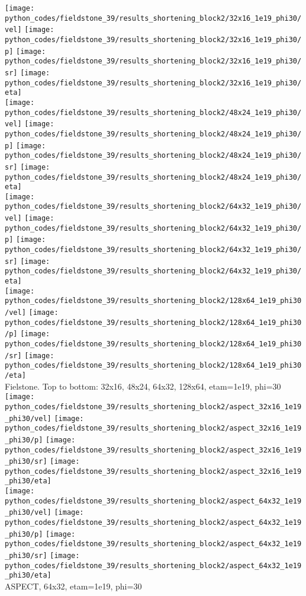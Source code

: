 \begin{center}
\texttt{[image: python\_codes/fieldstone\_39/results\_shortening\_block2/32x16\_1e19\_phi30/vel]}
\texttt{[image: python\_codes/fieldstone\_39/results\_shortening\_block2/32x16\_1e19\_phi30/p]}
\texttt{[image: python\_codes/fieldstone\_39/results\_shortening\_block2/32x16\_1e19\_phi30/sr]}
\texttt{[image: python\_codes/fieldstone\_39/results\_shortening\_block2/32x16\_1e19\_phi30/eta]}\\
\texttt{[image: python\_codes/fieldstone\_39/results\_shortening\_block2/48x24\_1e19\_phi30/vel]}
\texttt{[image: python\_codes/fieldstone\_39/results\_shortening\_block2/48x24\_1e19\_phi30/p]}
\texttt{[image: python\_codes/fieldstone\_39/results\_shortening\_block2/48x24\_1e19\_phi30/sr]}
\texttt{[image: python\_codes/fieldstone\_39/results\_shortening\_block2/48x24\_1e19\_phi30/eta]}\\
\texttt{[image: python\_codes/fieldstone\_39/results\_shortening\_block2/64x32\_1e19\_phi30/vel]}
\texttt{[image: python\_codes/fieldstone\_39/results\_shortening\_block2/64x32\_1e19\_phi30/p]}
\texttt{[image: python\_codes/fieldstone\_39/results\_shortening\_block2/64x32\_1e19\_phi30/sr]}
\texttt{[image: python\_codes/fieldstone\_39/results\_shortening\_block2/64x32\_1e19\_phi30/eta]}\\
\texttt{[image: python\_codes/fieldstone\_39/results\_shortening\_block2/128x64\_1e19\_phi30/vel]}
\texttt{[image: python\_codes/fieldstone\_39/results\_shortening\_block2/128x64\_1e19\_phi30/p]}
\texttt{[image: python\_codes/fieldstone\_39/results\_shortening\_block2/128x64\_1e19\_phi30/sr]}
\texttt{[image: python\_codes/fieldstone\_39/results\_shortening\_block2/128x64\_1e19\_phi30/eta]}\\
{\captionfont Fielstone. Top to bottom: 32x16, 48x24, 64x32, 128x64, etam=1e19, phi=30}\\
\texttt{[image: python\_codes/fieldstone\_39/results\_shortening\_block2/aspect\_32x16\_1e19\_phi30/vel]}
\texttt{[image: python\_codes/fieldstone\_39/results\_shortening\_block2/aspect\_32x16\_1e19\_phi30/p]}
\texttt{[image: python\_codes/fieldstone\_39/results\_shortening\_block2/aspect\_32x16\_1e19\_phi30/sr]}
\texttt{[image: python\_codes/fieldstone\_39/results\_shortening\_block2/aspect\_32x16\_1e19\_phi30/eta]}\\
\texttt{[image: python\_codes/fieldstone\_39/results\_shortening\_block2/aspect\_64x32\_1e19\_phi30/vel]}
\texttt{[image: python\_codes/fieldstone\_39/results\_shortening\_block2/aspect\_64x32\_1e19\_phi30/p]}
\texttt{[image: python\_codes/fieldstone\_39/results\_shortening\_block2/aspect\_64x32\_1e19\_phi30/sr]}
\texttt{[image: python\_codes/fieldstone\_39/results\_shortening\_block2/aspect\_64x32\_1e19\_phi30/eta]}\\
{\captionfont ASPECT, 64x32, etam=1e19, phi=30}\\
\end{center}

